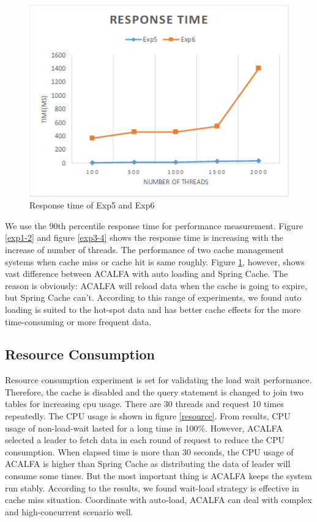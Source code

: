 \documentclass{singlecol-new}
\theoremstyle{TH}{
\newtheorem{lemma}{Lemma}
\newtheorem{theorem}[lemma]{Theorem}
\newtheorem{corrolary}[lemma]{Corrolary}
\newtheorem{conjecture}[lemma]{Conjecture}
\newtheorem{proposition}[lemma]{Proposition}
\newtheorem{claim}[lemma]{Claim}
\newtheorem{stheorem}[lemma]{Wrong Theorem}
}
\theoremstyle{THrm}{
\newtheorem{definition}{Definition}[section]
\newtheorem{question}{Question}[section]
\newtheorem{remark}{Remark}
\newtheorem{scheme}{Scheme}
}
\theoremstyle{THhit}{
\newtheorem{case}{Case}[section]
}
\begin{document}
\begin{figure} [htb]
    \centering
    \includegraphics[width=1\linewidth]{img/exp5-6.png}
    \caption{Response time of Exp5 and Exp6}
    \label{exp5-6}
\end{figure}

We use the 90th percentile response time for performance measurement. Figure \ref{exp1-2} and figure \ref{exp3-4} shows the response time is increasing with the increase of number of threads. The performance of two cache management systems when cache miss or cache hit is same roughly. Figure \ref{exp5-6}, however, shows vast difference between ACALFA with auto loading and Spring Cache. The reason is obviously: ACALFA will reload data when the cache is going to expire, but Spring Cache can't. According to this range of experiments, we found auto loading is suited to the hot-spot data and has better cache effects for the more time-consuming or more frequent data.

\subsection{Resource Consumption}

Resource consumption experiment is set for validating the load wait performance. Therefore, the cache is disabled and the query statement is changed to join two tables for increasing cpu usage. There are 30 threads and request 10 times repeatedly. The CPU usage is shown in figure \ref{resource}. From results, CPU usage of non-load-wait lasted for a long time in 100\%. However, ACALFA selected a leader to fetch data in each round of request to reduce the CPU consumption. When elapsed time is more than 30 seconds, the CPU usage of ACALFA is higher than Spring Cache as distributing the data of leader will consume some times. But the most important thing is ACALFA keeps the system run stably. According to the results, we found wait-load strategy is effective in cache miss situation. Coordinate with auto-load, ACALFA can deal with complex and high-concurrent scenario well.
\end{document}
